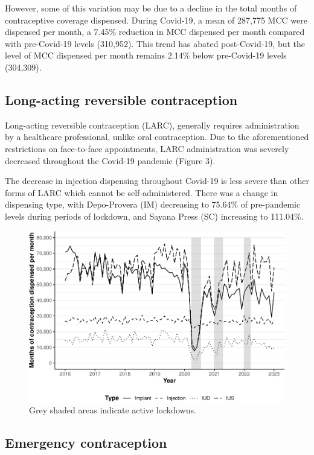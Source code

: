 \documentclass[
]{article}
\begin{document}
However, some of this variation may be due to a decline in the total
months of contraceptive coverage dispensed. During Covid-19, a mean of
287,775 MCC were dispensed per month, a 7.45\% reduction in MCC
dispensed per month compared with pre-Covid-19 levels (310,952). This
trend has abated post-Covid-19, but the level of MCC dispensed per month
remains 2.14\% below pre-Covid-19 levels (304,309).

\hypertarget{long-acting-reversible-contraception}{%
\subsection{Long-acting reversible
contraception}\label{long-acting-reversible-contraception}}

Long-acting reversible contraception (LARC), generally requires
administration by a healthcare professional, unlike oral contraception.
Due to the aforementioned restrictions on face-to-face appointments,
LARC administration was severely decreased throughout the Covid-19
pandemic (Figure 3).

The decrease in injection dispensing throughout Covid-19 is less severe
than other forms of LARC which cannot be self-administered. There was a
change in dispensing type, with Depo-Provera (IM) decreasing to 75.64\%
of pre-pandemic levels during periods of lockdown, and Sayana Press (SC)
increasing to 111.04\%.

\begin{figure}
\centering
\includegraphics{Manuscript_files/figure-latex/Figure3-1.pdf}
\caption{Grey shaded areas indicate active lockdowns.}
\end{figure}

\hypertarget{emergency-contraception}{%
\subsection{Emergency contraception}\label{emergency-contraception}}
\end{document}
